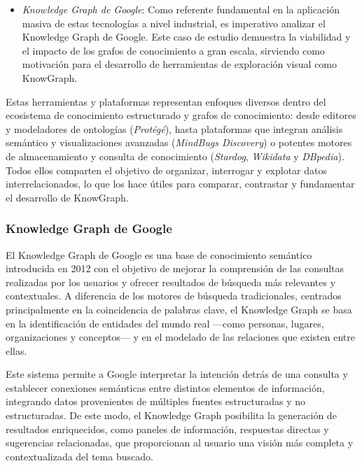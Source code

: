 \documentclass{article}
\begin{document}
\begin{itemize}
    \item  \textit{Knowledge Graph de Google}: Como referente fundamental en la aplicación masiva de estas tecnologías a nivel industrial, es imperativo analizar el Knowledge Graph de Google\cite{google2012knowledge}. Este caso de estudio demuestra la viabilidad y el impacto de los grafos de conocimiento a gran escala, sirviendo como motivación para el desarrollo de herramientas de exploración visual como KnowGraph.

\end{itemize}

Estas herramientas y plataformas representan enfoques diversos dentro del ecosistema de conocimiento estructurado y grafos de conocimiento: desde editores y modeladores de ontologías (\textit{Protégé}), hasta plataformas que integran análisis semántico y visualizaciones avanzadas (\textit{MindBugs Discovery}) o potentes motores de almacenamiento y consulta de conocimiento (\textit{Stardog}, \textit{Wikidata} y \textit{DBpedia}). Todos ellos comparten el objetivo de organizar, interrogar y explotar datos interrelacionados, lo que los hace útiles para comparar, contrastar y fundamentar el desarrollo de KnowGraph.

\subsubsection*{Knowledge Graph de Google}

El Knowledge Graph de Google es una base de conocimiento semántico introducida en 2012 con el objetivo de mejorar la comprensión de las consultas realizadas por los usuarios y ofrecer resultados de búsqueda más relevantes y contextuales. A diferencia de los motores de búsqueda tradicionales, centrados principalmente en la coincidencia de palabras clave, el Knowledge Graph se basa en la identificación de entidades del mundo real —como personas, lugares, organizaciones y conceptos— y en el modelado de las relaciones que existen entre ellas.

Este sistema permite a Google interpretar la intención detrás de una consulta y establecer conexiones semánticas entre distintos elementos de información, integrando datos provenientes de múltiples fuentes estructuradas y no estructuradas. De este modo, el Knowledge Graph posibilita la generación de resultados enriquecidos, como paneles de información, respuestas directas y sugerencias relacionadas, que proporcionan al usuario una visión más completa y contextualizada del tema buscado.
\end{document}
